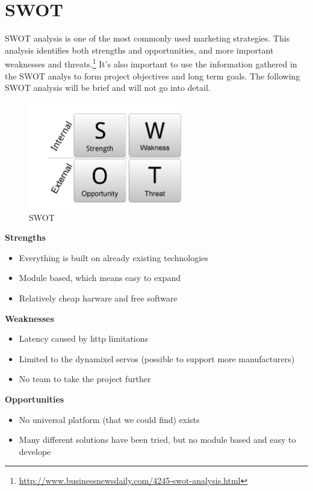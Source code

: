\chapter{SWOT}
SWOT analysis is one of the most commonly used marketing strategies. 
This analysis identifies both strengths and opportunities, and more important weaknesses and threats.\footnote{\url{http://www.businessnewsdaily.com/4245-swot-analysis.html}}
It's also important to use the information gathered in the SWOT analys to form project objectives and long term goals. 
The following SWOT analysis will be brief and will not go into detail. 
\vspace{\secspace}

\begin{figure}[H]
    \centering
    \includegraphics[width=0.6\textwidth]{graphics/swot.png}	
    \caption{SWOT}
    \label{fig:sw}
\end{figure}

\textbf{\Large Strengths}
\begin{itemize}
	 \item Everything is built on already existing technologies
	 \item Module based, which means easy to expand
	 \item Relatively cheap harware and free software
\end{itemize}

\textbf{\Large Weaknesses}
\begin{itemize}
	 \item Latency caused by http limitations
	 \item Limited to the dynamixel servos (possible to support more manufacturers)
	 \item No team to take the project further
\end{itemize}

\textbf{\Large Opportunities}
\begin{itemize}
	 \item No universal platform (that we could find) exists
	 \item Many different solutions have been tried, but no module based and easy to develope
\end{itemize}

